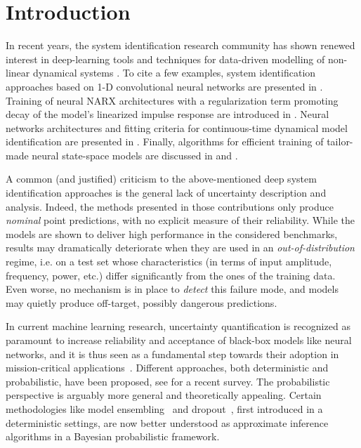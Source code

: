 \documentclass{ifacconf}
\begin{document}
\section{Introduction}
In recent years, the system identification research community has shown renewed interest in deep-learning tools and techniques for data-driven modelling of non-linear dynamical systems \citep{ljung2020deep}. %
To cite a few examples, system identification approaches based on 1-D convolutional neural networks are presented in \cite{andersson2019, wu2019deep}.
Training of neural NARX architectures with a regularization term promoting decay of the model's linearized impulse response are introduced in 
\cite{peeters2022narx}. Neural networks architectures and fitting criteria  for continuous-time dynamical model identification are presented in \cite{Mavkov20}. %
Finally, algorithms for efficient training of tailor-made neural state-space models are discussed in \cite{forgione2020model} and \cite{beintema2021nonlinear}. 

A common (and justified) criticism to the above-mentioned deep system identification approaches is the general lack of uncertainty description and analysis. Indeed, the methods presented in those contributions only produce \emph{nominal} point predictions, with no explicit measure of their reliability.
While the models are shown to deliver high performance in the considered benchmarks, results may dramatically deteriorate when they are used in an \emph{out-of-distribution} regime, i.e. on a test set whose characteristics (in terms of input amplitude, frequency, power, etc.) differ significantly from the ones of the training data. Even worse, no mechanism is in place to \emph{detect} this failure mode, and models may quietly produce off-target, possibly dangerous predictions.

In current machine learning research, uncertainty quantification is recognized as paramount to increase reliability and acceptance of black-box models like neural networks, and it is thus seen as a fundamental step towards their adoption in mission-critical
applications~\citep{loquercio2020general}. Different approaches, both deterministic and probabilistic, have been proposed, see \cite{gawlikowski2021survey} for a recent survey. The probabilistic perspective is arguably more general and theoretically appealing. Certain methodologies like model ensembling~\citep{lakshminarayanan2017simple} and dropout~\citep{srivastava2014dropout}, first introduced in a deterministic settings, are now better understood as approximate inference algorithms in a Bayesian probabilistic framework.
\end{document}
